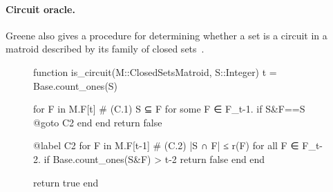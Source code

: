 \paragraph{Circuit oracle.} Greene also gives a procedure for determining whether a set is a circuit in a matroid described by its family of closed sets~\cite{greene-1991}.

\begin{figure}[ht!]
\begin{jllisting}
function is_circuit(M::ClosedSetsMatroid, S::Integer)
  t = Base.count_ones(S)

  for F in M.F[t] # (C.1) S ⊆ F for some F ∈ F_{t-1}.
    if S&F==S @goto C2 end
  end
  return false

  @label C2
  for F in M.F[t-1] # (C.2) |S ∩ F| ≤ r(F) for all F ∈ F_{t-2}.
    if Base.count_ones(S&F) > t-2 return false end
  end

  return true
end
\end{jllisting}
\end{figure}




    

